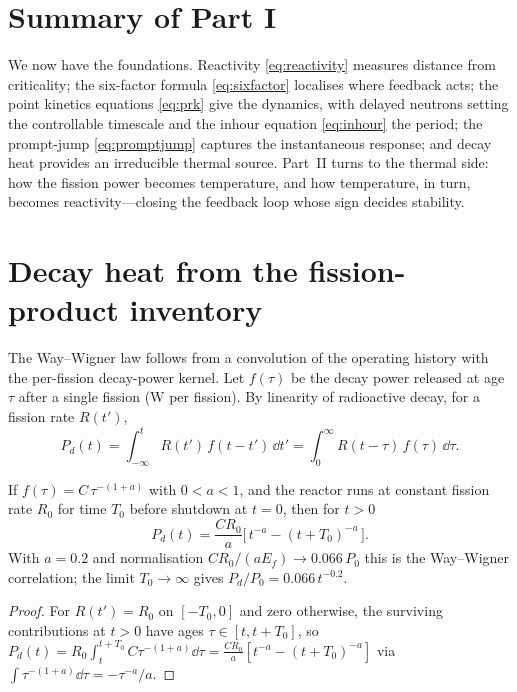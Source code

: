 
\section{Summary of Part I}

We now have the foundations. Reactivity \eqref{eq:reactivity} measures distance
from criticality; the six-factor formula \eqref{eq:sixfactor} localises where
feedback acts; the point kinetics equations \eqref{eq:prk} give the dynamics,
with delayed neutrons setting the controllable timescale and the inhour equation
\eqref{eq:inhour} the period; the prompt-jump \eqref{eq:promptjump} captures the
instantaneous response; and decay heat provides an irreducible thermal source.
Part~II turns to the thermal side: how the fission power becomes temperature, and
how temperature, in turn, becomes reactivity---closing the feedback loop whose
sign decides stability.



\section{Decay heat from the fission-product inventory}
\label{sec:decay-conv}

The Way--Wigner law follows from a convolution of the operating history with the
per-fission decay-power kernel. Let $f(\tau)$ be the decay power released at age
$\tau$ after a single fission (W per fission). By linearity of radioactive decay,
for a fission rate $R(t')$,
\begin{equation}
P_d(t)=\int_{-\infty}^{t} R(t')\,f(t-t')\,\dd t'
      =\int_0^{\infty} R(t-\tau)\,f(\tau)\,\dd\tau .
\label{eq:decay-conv}
\end{equation}

\begin{proposition}
\label{prop:waywigner}
If $f(\tau)=C\,\tau^{-(1+a)}$ with $0<a<1$, and the reactor runs at constant
fission rate $R_0$ for time $T_0$ before shutdown at $t=0$, then for $t>0$
\begin{equation}
P_d(t)=\frac{C R_0}{a}\Big[\,t^{-a}-(t+T_0)^{-a}\,\Big].
\end{equation}
With $a=0.2$ and normalisation $CR_0/(aE_f)\to 0.066\,P_0$ this is the Way--Wigner
correlation; the limit $T_0\to\infty$ gives $P_d/P_0=0.066\,t^{-0.2}$.
\end{proposition}
\begin{proof}
For $R(t')=R_0$ on $[-T_0,0]$ and zero otherwise, the surviving contributions at
$t>0$ have ages $\tau\in[t,t+T_0]$, so
$P_d(t)=R_0\!\int_t^{t+T_0}\!C\tau^{-(1+a)}\dd\tau
=\tfrac{CR_0}{a}[t^{-a}-(t+T_0)^{-a}]$ via $\int\tau^{-(1+a)}\dd\tau=-\tau^{-a}/a$.
\end{proof}

